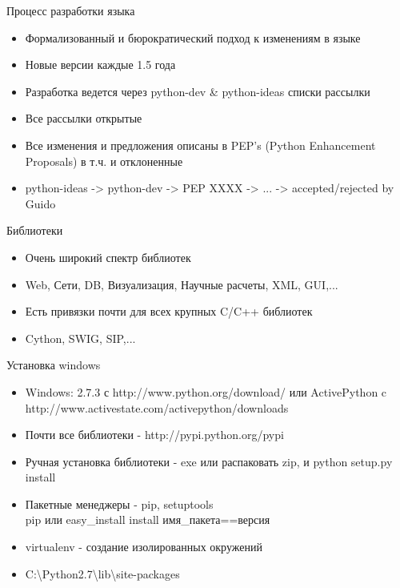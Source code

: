 \documentclass{article}
\begin{document}
\begin{center} Процесс разработки языка \end{center}
\begin{itemize}
    \item Формализованный и бюрократический подход к изменениям в языке
    \item Новые версии каждые 1.5 года
    \item Разработка ведется через python-dev \& python-ideas списки рассылки
    \item Все рассылки открытые
    \item Все изменения и предложения описаны в PEP's (Python Enhancement Proposals) 
            в т.ч. и отклоненные
    \item python-ideas -> python-dev -> PEP XXXX -> ... -> {accepted/rejected} by Guido
\end{itemize}
\newpage

\begin{center} Библиотеки \end{center}
\begin{itemize}
    \item Очень широкий спектр библиотек
    \item Web, Сети, DB, Визуализация, Научные расчеты, XML, GUI,...
    \item Есть привязки почти для всех крупных C/C++ библиотек
    \item Cython, SWIG, SIP,...
\end{itemize}
\newpage

\begin{center} Установка windows \end{center}
\begin{itemize}
    \item Windows: 2.7.3 с http://www.python.org/download/ 
    или ActivePython c http://www.activestate.com/activepython/downloads
    \item Почти все библиотеки - http://pypi.python.org/pypi
    \item Ручная установка библиотеки - exe или распаковать zip, и python setup.py install
    \item Пакетные менеджеры - pip, setuptools \\
    	pip или easy\_install install имя\_пакета==версия
    \item virtualenv - создание изолированных окружений
    \item C:{\textbackslash}Python2.7{\textbackslash}lib{\textbackslash}site-packages
\end{itemize}
\newpage
\end{document}
